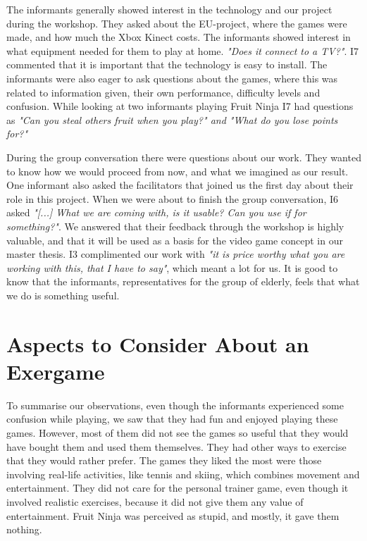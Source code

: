 The informants generally showed interest in the technology and our project during the workshop. They asked about the EU-project, where the games were made, and how much the Xbox Kinect costs. The informants showed interest in what equipment needed for them to play at home. \emph{"Does it connect to a TV?"}. I7 commented that it is important that the technology is easy to install. The informants were also eager to ask questions about the games, where this was related to information given, their own performance, difficulty levels and confusion. While looking at two informants playing Fruit Ninja I7 had questions as \emph{"Can you steal others fruit when you play?" and "What do you lose points for?"} 

During the group conversation there were questions about our work. They wanted to know how we would proceed from now, and what we imagined as our result. One informant also asked the facilitators that joined us the first day about their role in this project. When we were about to finish the group conversation, I6 asked \emph{"[...] What we are coming with, is it usable? Can you use if for something?"}. We answered that their feedback through the workshop is highly valuable, and that it will be used as a basis for the video game concept in our master thesis. I3 complimented our work with \emph{"it is price worthy what you are working with this, that I have to say"}, which meant a lot for us. It is good to know that the informants, representatives for the group of elderly, feels that what we do is something useful.  

\section{Aspects to Consider About an Exergame}

To summarise our observations, even though the informants experienced some confusion while playing, we saw that they had fun and enjoyed playing these games. However, most of them did not see the games so useful that they would have bought them and used them themselves. They had other ways to exercise that they would rather prefer. The games they liked the most were those involving real-life activities, like tennis and skiing, which combines movement and entertainment. They did not care for the personal trainer game, even though it involved realistic exercises, because it did not give them any value of 
entertainment. Fruit Ninja was perceived as stupid, and mostly, it gave them nothing.
 


